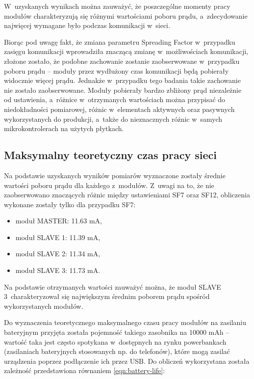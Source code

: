 


\FloatBarrier
W~uzyskanych wynikach można zauważyć, że poszczególne momenty pracy modułów charakteryzują się różnymi wartościami
poboru prądu, a~zdecydowanie najwięcej wymagane było podczas komunikacji w~sieci.

Biorąc pod uwagę fakt, że zmiana parametru Spreading Factor w~przypadku zasięgu komunikacji wprowadziła znaczącą zmianę
w~możliwościach komunikacji, złożone zostało, że podobne zachowanie zostanie zaobserwowane w~przypadku poboru prądu --
moduły przez wydłużony czas komunikacji będą pobierały widocznie więcej prądu. Jednakże w~przypadku tego badania takie
zachowanie nie zostało zaobserwowane. Moduły pobierały bardzo zbliżony prąd niezależnie od ustawienia, a~różnice
w~otrzymanych wartościach można przypisać do niedokładności pomiarowej, różnic w~elementach aktywnych oraz pasywnych
wykorzystanych do produkcji, a~także do nieznacznych różnic w~samych mikrokontrolerach na użytych płytkach.

\subsection{\label{sect:network-work-on-battery}Maksymalny teoretyczny czas pracy sieci} Na podstawie uzyskanych wyników
pomiarów wyznaczone zostały średnie wartości poboru prądu dla każdego z~modułów. Z~uwagi na to, że nie zaobserwowano
znaczących różnic między ustawieniami SF7 oraz SF12, obliczenia wykonane zostały tylko dla przypadku SF7:
\begin{itemize}[label=--]
    \item moduł MASTER: 11.63 mA,
    \item moduł SLAVE 1: 11.39 mA,
    \item moduł SLAVE 2: 11.34 mA,
    \item moduł SLAVE 3: 11.73 mA.
\end{itemize}
Na podstawie otrzymanych wartości zauważyć można, że moduł SLAVE 3~charakteryzował się największym średnim poborem prądu
spośród wykorzystanych modułów.

Do wyznaczenia teoretycznego maksymalnego czasu pracy modułów na zasilaniu bateryjnym przyjęta została pojemność takiego
zasobnika na 10000 mAh -- wartość taka jest często spotykana w~dostępnych na rynku powerbankach (zasilaniach
bateryjnych stosowanych np. do telefonów), które mogą zasilać urządzenia poprzez podłączenie ich przez USB. Do obliczeń
wykorzystana została zależność przedstawiona równaniem \ref{eqn:battery-life}:


